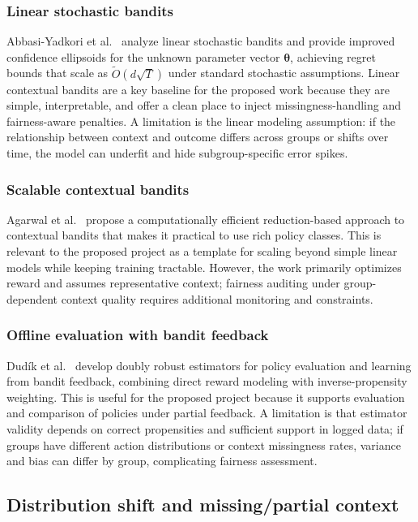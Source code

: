 \documentclass[conference]{IEEEtran}
\begin{document}
\subsubsection{Linear stochastic bandits}
Abbasi-Yadkori et al.~\cite{abbasi2011linear} analyze linear stochastic bandits and provide
improved confidence ellipsoids for the unknown parameter vector $\boldsymbol{\theta}$,
achieving regret bounds that scale as $\tilde{O}(d\sqrt{T})$ under standard stochastic
assumptions. Linear contextual bandits are a key baseline for the proposed work because they
are simple, interpretable, and offer a clean place to inject missingness-handling and
fairness-aware penalties. A limitation is the linear modeling assumption: if the relationship
between context and outcome differs across groups or shifts over time, the model can underfit
and hide subgroup-specific error spikes.

\subsubsection{Scalable contextual bandits}
Agarwal et al.~\cite{agarwal2014taming} propose a computationally efficient reduction-based
approach to contextual bandits that makes it practical to use rich policy classes. This is
relevant to the proposed project as a template for scaling beyond simple linear models while
keeping training tractable. However, the work primarily optimizes reward and assumes
representative context; fairness auditing under group-dependent context quality requires
additional monitoring and constraints.

\subsubsection{Offline evaluation with bandit feedback}
Dud\'{i}k et al.~\cite{dudik2011doubly} develop doubly robust estimators for policy
evaluation and learning from bandit feedback, combining direct reward modeling with
inverse-propensity weighting. This is useful for the proposed project because it supports
evaluation and comparison of policies under partial feedback. A limitation is that estimator
validity depends on correct propensities and sufficient support in logged data; if groups
have different action distributions or context missingness rates, variance and bias can differ
by group, complicating fairness assessment.


\subsection{Distribution shift and missing/partial context}
\end{document}
